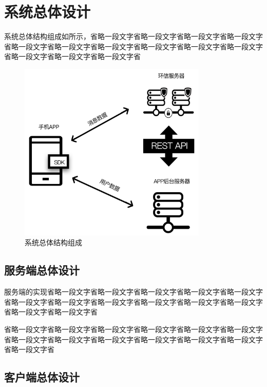 \section{系统总体设计}

	系统总体结构组成如所示，省略一段文字省略一段文字省略一段文字省略一段文字省略一段文字省略一段文字省略一段文字省略一段文字省略一段文字省略一段文字省略一段文字省略一段文字省略一段文字省
		
	\begin{figure}[H]
		\centering
		\includegraphics[width=0.80\textwidth]{images/all_design}
		\caption{系统总体结构组成}
		\label{overall_structure}
	\end{figure}
	
	\subsection{服务端总体设计}
	
		服务端的实现省略一段文字省略一段文字省略一段文字省略一段文字省略一段文字省略一段文字省略一段文字省略一段文字省略一段文字省略一段文字省略一段文字省略一段文字省略一段文字省		  
		  
		 省略一段文字省略一段文字省略一段文字省略一段文字省略一段文字省略一段文字省略一段文字省略一段文字省略一段文字省略一段文字省略一段文字省略一段文字省略一段文字省
		 
		  		  
		  
	\subsection{客户端总体设计}
		
